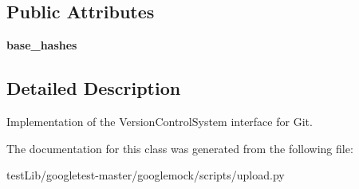 \subsection*{Public Attributes}
\begin{DoxyCompactItemize}
\item 
\mbox{\label{classupload_1_1GitVCS_a07e9469050a157f34fe804cdf6ecddac}} 
{\bfseries base\+\_\+hashes}
\end{DoxyCompactItemize}


\subsection{Detailed Description}
\begin{DoxyVerb}Implementation of the VersionControlSystem interface for Git.\end{DoxyVerb}
 

The documentation for this class was generated from the following file\+:\begin{DoxyCompactItemize}
\item 
test\+Lib/googletest-\/master/googlemock/scripts/upload.\+py\end{DoxyCompactItemize}
